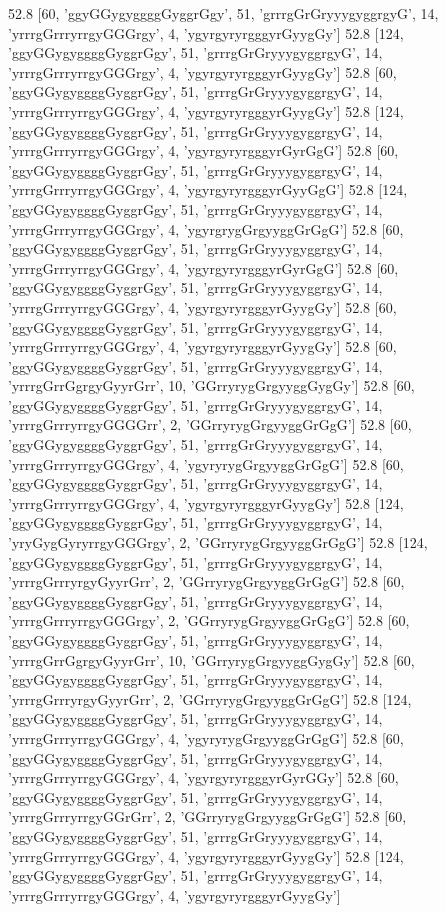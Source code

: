 52.8 [60, 'ggyGGygyggggGyggrGgy', 51, 'grrrgGrGryyygyggrgyG', 14, 'yrrrgGrrryrrgyGGGrgy', 4, 'ygyrgyryrgggyrGyygGy']
52.8 [124, 'ggyGGygyggggGyggrGgy', 51, 'grrrgGrGryyygyggrgyG', 14, 'yrrrgGrrryrrgyGGGrgy', 4, 'ygyrgyryrgggyrGyygGy']
52.8 [60, 'ggyGGygyggggGyggrGgy', 51, 'grrrgGrGryyygyggrgyG', 14, 'yrrrgGrrryrrgyGGGrgy', 4, 'ygyrgyryrgggyrGyygGy']
52.8 [124, 'ggyGGygyggggGyggrGgy', 51, 'grrrgGrGryyygyggrgyG', 14, 'yrrrgGrrryrrgyGGGrgy', 4, 'ygyrgyryrgggyrGyrGgG']
52.8 [60, 'ggyGGygyggggGyggrGgy', 51, 'grrrgGrGryyygyggrgyG', 14, 'yrrrgGrrryrrgyGGGrgy', 4, 'ygyrgyryrgggyrGyyGgG']
52.8 [124, 'ggyGGygyggggGyggrGgy', 51, 'grrrgGrGryyygyggrgyG', 14, 'yrrrgGrrryrrgyGGGrgy', 4, 'ygyrgrygGrgyyggGrGgG']
52.8 [60, 'ggyGGygyggggGyggrGgy', 51, 'grrrgGrGryyygyggrgyG', 14, 'yrrrgGrrryrrgyGGGrgy', 4, 'ygyrgyryrgggyrGyrGgG']
52.8 [60, 'ggyGGygyggggGyggrGgy', 51, 'grrrgGrGryyygyggrgyG', 14, 'yrrrgGrrryrrgyGGGrgy', 4, 'ygyrgyryrgggyrGyygGy']
52.8 [60, 'ggyGGygyggggGyggrGgy', 51, 'grrrgGrGryyygyggrgyG', 14, 'yrrrgGrrryrrgyGGGrgy', 4, 'ygyrgyryrgggyrGyygGy']
52.8 [60, 'ggyGGygyggggGyggrGgy', 51, 'grrrgGrGryyygyggrgyG', 14, 'yrrrgGrrGgrgyGyyrGrr', 10, 'GGrryrygGrgyyggGygGy']
52.8 [60, 'ggyGGygyggggGyggrGgy', 51, 'grrrgGrGryyygyggrgyG', 14, 'yrrrgGrrryrrgyGGGGrr', 2, 'GGrryrygGrgyyggGrGgG']
52.8 [60, 'ggyGGygyggggGyggrGgy', 51, 'grrrgGrGryyygyggrgyG', 14, 'yrrrgGrrryrrgyGGGrgy', 4, 'ygyryrygGrgyyggGrGgG']
52.8 [60, 'ggyGGygyggggGyggrGgy', 51, 'grrrgGrGryyygyggrgyG', 14, 'yrrrgGrrryrrgyGGGrgy', 4, 'ygyrgyryrgggyrGyygGy']
52.8 [124, 'ggyGGygyggggGyggrGgy', 51, 'grrrgGrGryyygyggrgyG', 14, 'yryGygGyryrrgyGGGrgy', 2, 'GGrryrygGrgyyggGrGgG']
52.8 [124, 'ggyGGygyggggGyggrGgy', 51, 'grrrgGrGryyygyggrgyG', 14, 'yrrrgGrrryrgyGyyrGrr', 2, 'GGrryrygGrgyyggGrGgG']
52.8 [60, 'ggyGGygyggggGyggrGgy', 51, 'grrrgGrGryyygyggrgyG', 14, 'yrrrgGrrryrrgyGGGrgy', 2, 'GGrryrygGrgyyggGrGgG']
52.8 [60, 'ggyGGygyggggGyggrGgy', 51, 'grrrgGrGryyygyggrgyG', 14, 'yrrrgGrrGgrgyGyyrGrr', 10, 'GGrryrygGrgyyggGygGy']
52.8 [60, 'ggyGGygyggggGyggrGgy', 51, 'grrrgGrGryyygyggrgyG', 14, 'yrrrgGrrryrgyGyyrGrr', 2, 'GGrryrygGrgyyggGrGgG']
52.8 [124, 'ggyGGygyggggGyggrGgy', 51, 'grrrgGrGryyygyggrgyG', 14, 'yrrrgGrrryrrgyGGGrgy', 4, 'ygyryrygGrgyyggGrGgG']
52.8 [60, 'ggyGGygyggggGyggrGgy', 51, 'grrrgGrGryyygyggrgyG', 14, 'yrrrgGrrryrrgyGGGrgy', 4, 'ygyrgyryrgggyrGyrGGy']
52.8 [60, 'ggyGGygyggggGyggrGgy', 51, 'grrrgGrGryyygyggrgyG', 14, 'yrrrgGrrryrrgyGGrGrr', 2, 'GGrryrygGrgyyggGrGgG']
52.8 [60, 'ggyGGygyggggGyggrGgy', 51, 'grrrgGrGryyygyggrgyG', 14, 'yrrrgGrrryrrgyGGGrgy', 4, 'ygyrgyryrgggyrGyygGy']
52.8 [124, 'ggyGGygyggggGyggrGgy', 51, 'grrrgGrGryyygyggrgyG', 14, 'yrrrgGrrryrrgyGGGrgy', 4, 'ygyrgyryrgggyrGyygGy']
